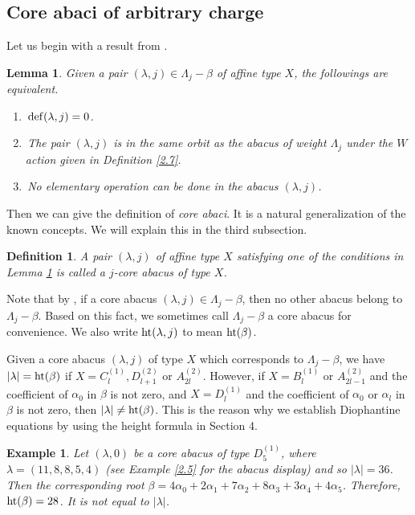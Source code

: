 \documentclass[11pt]{amsart}
\theoremstyle{plain}
\numberwithin{equation}{subsection}
\newtheorem{lemma}[theorem]{Lemma}
\newtheorem{definition}[theorem]{Definition}
\newtheorem{example}[theorem]{Example}
\newcommand{\lam}{\lambda}
\begin{document}
\subsection{Core abaci of arbitrary charge}

Let us begin with a result from \cite{HLQ}.
\begin{lemma}\cite[Theorem 6.11, Lemma 6.12]{HLQ}\label{3.1}
Given a pair $(\lam, j)\in \Lambda_j-\beta$ of affine type $X$, the followings are equivalent.
\begin{enumerate}
\item[\rm(1)]\,${\rm def}(\lam, j)=0$.
\item[\rm(2)]\,The pair $(\lam, j)$ is in the same orbit as the abacus of weight $\Lambda_j$ under the $W$ action given in Definition \ref{2.7}.
\item[\rm(3)]\,No elementary operation can be done in the abacus $(\lam, j)$.
\end{enumerate}
\end{lemma}

Then we can give  the definition of {\em core abaci}. It is a natural generalization of the known concepts.
We will explain this in the third subsection.
\begin{definition}\label{3.2}
A pair $(\lam, j)$ of affine type $X$ satisfying one of the conditions in Lemma \ref{3.1} is called a $j$-core abacus of type $X$.
\end{definition}

Note that by \cite[Proposition 11.4]{Kac}, if a core abacus $(\lam, j)\in \Lambda_j-\beta$, then no other abacus belong to $\Lambda_j-\beta$. 
Based on this fact, we sometimes call $\Lambda_j-\beta$ a core abacus for convenience. We also write ${\rm ht}(\lam, j)$ to mean ${\rm ht}(\beta)$.

\smallskip

Given a core abacus $(\lam, j)$ of type $X$ which corresponds to $\Lambda_j-\beta$, we have $|\lam|={\rm ht}(\beta)$ 
if $X=C_l^{(1)}, D_{l+1}^{(2)}$ or $A_{2l}^{(2)}$. However, if $X=B_l^{(1)}$ or $A_{2l-1}^{(2)}$  and the coefficient of 
$\alpha_0$ in $\beta$ is not zero, and $X=D_l^{(1)}$  and the coefficient of 
$\alpha_0$ or $\alpha_l$ in $\beta$ is not zero, then $|\lam|\neq{\rm ht}(\beta)$.
This is the reason why we establish Diophantine equations by using the height formula in Section 4.

\begin{example}{\rm
Let $(\lam, 0)$ be a core abacus of type $D_5^{(1)}$, where $\lam=(11, 8, 8, 5, 4)$ (see Example \ref{2.5} for the abacus display) and so  $|\lam|=36$. 
Then the corresponding root $\beta=4\alpha_0+2\alpha_1+7\alpha_2+8\alpha_3+3\alpha_4+4\alpha_5$.
Therefore, ${\rm ht}(\beta)=28$. It is not equal to $|\lam|$.}
\end{example}
\end{document}

